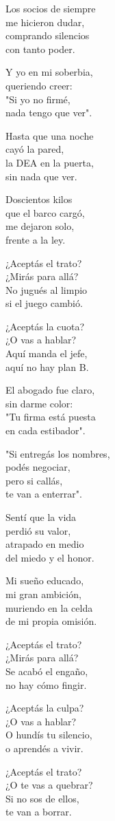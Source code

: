 \begin{lyrics}
Los socios de siempre\\
me hicieron dudar,\\
comprando silencios\\
con tanto poder.

Y yo en mi soberbia,\\
queriendo creer:\\
"Si yo no firmé,\\
nada tengo que ver".

Hasta que una noche\\
cayó la pared,\\
la DEA en la puerta,\\
sin nada que ver.

Doscientos kilos\\
que el barco cargó,\\
me dejaron solo,\\
frente a la ley.

¿Aceptás el trato?\\
¿Mirás para allá?\\
No jugués al limpio\\
si el juego cambió.

¿Aceptás la cuota?\\
¿O vas a hablar?\\
Aquí manda el jefe,\\
aquí no hay plan B.

El abogado fue claro,\\
sin darme color:\\
"Tu firma está puesta\\
en cada estibador".

"Si entregás los nombres,\\
podés negociar,\\
pero si callás,\\
te van a enterrar".

Sentí que la vida\\
perdió su valor,\\
atrapado en medio\\
del miedo y el honor.

Mi sueño educado,\\
mi gran ambición,\\
muriendo en la celda\\
de mi propia omisión.

¿Aceptás el trato?\\
¿Mirás para allá?\\
Se acabó el engaño,\\
no hay cómo fingir.

¿Aceptás la culpa?\\
¿O vas a hablar?\\
O hundís tu silencio,\\
o aprendés a vivir.

¿Aceptás el trato?\\
¿O te vas a quebrar?\\
Si no sos de ellos,\\
te van a borrar.

\end{lyrics}

